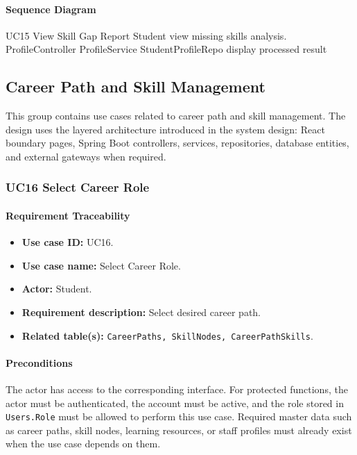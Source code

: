 \paragraph{Sequence Diagram}

\SequenceDiagram
{UC15 View Skill Gap Report}
{Student}
{view missing skills analysis.}
{ProfileController}
{ProfileService}
{StudentProfileRepo}
{display processed result}

\subsection{Career Path and Skill Management}

This group contains use cases related to career path and skill management. The design uses the layered architecture introduced in the system design: React boundary pages, Spring Boot controllers, services, repositories, database entities, and external gateways when required.

\subsubsection{UC16 Select Career Role}

\paragraph{Requirement Traceability}

\begin{itemize}
    \item \textbf{Use case ID:} UC16.
    \item \textbf{Use case name:} Select Career Role.
    \item \textbf{Actor:} Student.
    \item \textbf{Requirement description:} Select desired career path.
    \item \textbf{Related table(s):} \texttt{CareerPaths, SkillNodes, CareerPathSkills}.
\end{itemize}

\paragraph{Preconditions}

The actor has access to the corresponding interface. For protected functions, the actor must be authenticated, the account must be active, and the role stored in \texttt{Users.Role} must be allowed to perform this use case. Required master data such as career paths, skill nodes, learning resources, or staff profiles must already exist when the use case depends on them.

